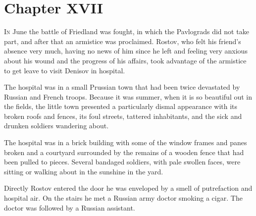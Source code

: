 
\chapter*{Chapter XVII}
\ifaudio     
{} 
\fi

\lettrine[lines=2, loversize=0.3, lraise=0]{\initfamily I}{n}
June the battle of Friedland was fought, in which the
Pavlograds did not take part, and after that an armistice was
proclaimed. Rostov, who felt his friend's absence very much,
having no news of him since he left and feeling very anxious
about his wound and the progress of his affairs, took advantage
of the armistice to get leave to visit Denisov in hospital.

The hospital was in a small Prussian town that had been twice
devastated by Russian and French troops. Because it was summer,
when it is so beautiful out in the fields, the little town
presented a particularly dismal appearance with its broken roofs
and fences, its foul streets, tattered inhabitants, and the sick
and drunken soldiers wandering about.

The hospital was in a brick building with some of the window
frames and panes broken and a courtyard surrounded by the remains
of a wooden fence that had been pulled to pieces. Several
bandaged soldiers, with pale swollen faces, were sitting or
walking about in the sunshine in the yard.

Directly Rostov entered the door he was enveloped by a smell of
putrefaction and hospital air. On the stairs he met a Russian
army doctor smoking a cigar. The doctor was followed by a Russian
assistant.

